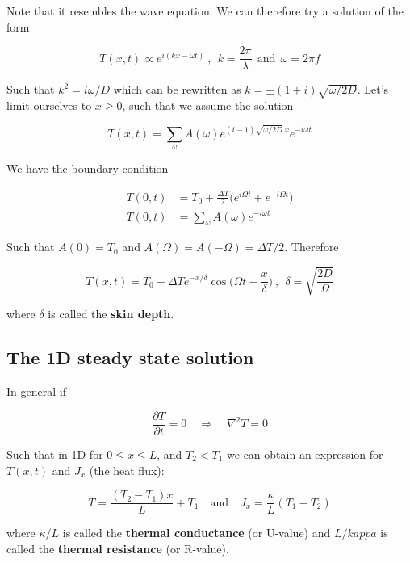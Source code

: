 \documentclass[a4paper]{article}
\begin{document}
Note that it resembles the wave equation. We can therefore try a solution of the form

\begin{equation}
	T(x, t)\propto e^{i(kx-\omega t)} \ , \ \ k=\frac{2\pi}{\lambda}\ \ \text{and} \ \ \omega=2\pi f
\end{equation}

Such that $k^2=i\omega/D$ which can be rewritten as $k=\pm(1+i)\sqrt{\omega/2D}$. Let's limit ourselves to $x\ge 0$, such that we assume the solution

\begin{equation}
	T(x, t)=\sum_\omega A(\omega)e^{(i-1)\sqrt{\omega/2D}\,x}e^{-i\omega t}
\end{equation}

We have the boundary condition

\begin{align}
	T(0, t)&=T_0+\frac{\Delta T}{2}\bigg(e^{i\Omega t}+e^{-i\Omega t}\bigg)\\[1em]
	T(0, t)&=\sum_\omega A(\omega)e^{-i\omega t}
\end{align}

Such that $A(0)=T_0$ and $A(\Omega)=A(-\Omega)=\Delta T/2$. Therefore

\begin{equation}
	T(x, t)=T_0+\Delta Te^{-x/\delta}\cos\bigg(\Omega t-\frac{x}{\delta}\bigg)\ , \ \ \delta=\sqrt{\frac{2D}{\Omega}}
\end{equation}

where $\delta$ is called the \textbf{skin depth}.

\subsection{The 1D steady state solution}

In general if 

\begin{equation}
	\frac{\partial T}{\partial t}=0\quad\Rightarrow\quad \nabla^2T=0
\end{equation}

Such that in 1D for $0\le x\le L$, and $T_2<T_1$ we can obtain an expression for $T(x, t)$ and $J_x$ (the heat flux):

\begin{equation}
	T=\frac{(T_2-T_1)x}{L}+T_1\quad\text{and}\quad J_x=\frac{\kappa}{L}(T_1-T_2)
\end{equation}

where $\kappa/L$ is called the \textbf{thermal conductance} (or U-value) and $L/kappa$ is called the \textbf{thermal resistance} (or R-value).
\end{document}
